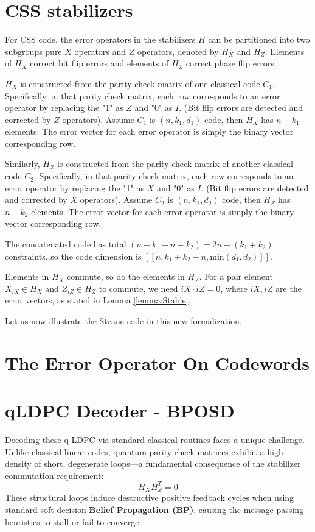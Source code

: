 \section{CSS stabilizers}
For CSS code, the error operators in the stabilizers \(H\) can be partitioned into two subgroups pure \(X\) operators and \(Z\) operators, denoted by \(H_X\) and \(H_Z\). Elements of \(H_X\) correct bit flip errors and elements of \(H_Z\) correct phase flip errors.  

\(H_X\) is constructed from the parity check matrix of one classical code \(C_1\). Specifically, in that parity check matrix, each row corresponds to an error operator by replacing the "1" as \(Z\) and "0" as \(I\). (Bit flip errors are detected and corrected by \(Z\) operators). Assume \(C_1\) is \((n, k_1, d_1)\) code, then \(H_X\) has \(n-k_1\) elements. The error vector for each error operator is simply the binary vector corresponding row. 

Similarly, \(H_Z\) is constructed from the parity check matrix of another classical code \(C_2\). Specifically, in that parity check matrix, each row corresponds to an error operator by replacing the "1" as \(X\) and "0" as \(I\). (Bit flip errors are detected and corrected by \(X\) operators). Assume \(C_2\) is \((n, k_2, d_2)\) code, then \(H_Z\) has \(n-k_2\) elements. The error vector for each error operator is simply the binary vector corresponding row. 

The concatenated code has total \((n-k_1 + n - k_2) = 2n - (k_1 + k_2)\) constraints, so the code dimension is \([[n, k_1 + k_2 -n, \text{min}(d_1, d_2)]]\).

Elements in \(H_X\) commute, so do the elements in \(H_Z\). For a pair element \(X_{iX} \in H_X\) and \(Z_{iZ} \in H_Z\) to commute, we need \(iX\cdot iZ = 0\), where \(iX, iZ\) are the error vectors, as stated in Lemma \ref{lemma:Stable}.  


Let us now illustrate the Steane code in this new formalization.


\section{The Error Operator On Codewords}

\section{qLDPC Decoder - BPOSD}

Decoding these q-LDPC via standard classical routines faces a unique challenge. Unlike classical linear codes, quantum parity-check matrices exhibit a high density of short, degenerate loops—a fundamental consequence of the stabilizer commutation requirement:
\begin{equation}
    H_X H_Z^T = 0
\end{equation}
These structural loops induce destructive positive feedback cycles when using standard soft-decision \textbf{Belief Propagation (BP)}, causing the message-passing heuristics to stall or fail to converge. 

